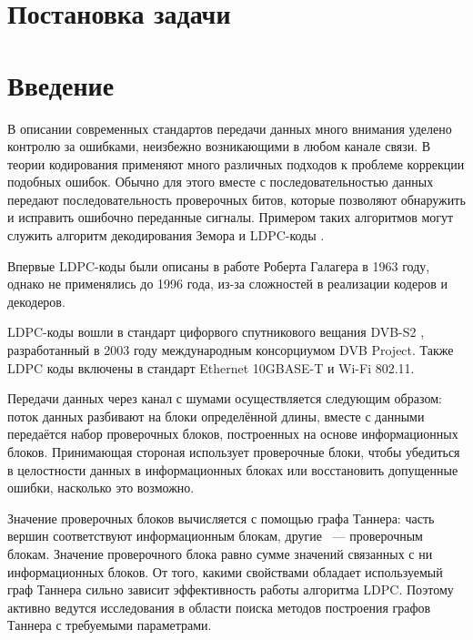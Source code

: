 \documentclass[14pt]{mmcs_article}
\begin{document}


\renewcommand{\contentsname}{Оглавление}

\tableofcontents

\newpage
{}

\section*{Постановка задачи}

\newpage
{}
\section*{Введение}

В описании современных стандартов передачи данных много внимания уделено контролю за ошибками, неизбежно возникающими в любом канале связи. В теории кодирования применяют много различных подходов к проблеме коррекции подобных ошибок. Обычно для этого вместе с последовательностью данных передают последовательность проверочных битов, которые позволяют обнаружить и исправить ошибочно переданные сигналы. Примером таких алгоритмов могут служить алгоритм декодирования Земора \cite{zemor} и LDPC-коды \cite{johnson}.

Впервые LDPC-коды были описаны в работе Роберта Галагера \cite{gallager} в 1963 году, однако не применялись до 1996 года, из-за сложностей в реализации кодеров и декодеров.

LDPC-коды вошли в стандарт цифорвого спутникового вещания DVB-S2 \cite{dvb-s2}, разработанный в 2003 году международным консорциумом DVB Project. Также LDPC коды включены в стандарт Ethernet 10GBASE-T и Wi-Fi 802.11.

Передачи данных через канал с шумами осуществляется следующим образом: поток данных разбивают на блоки определённой длины, вместе с данными передаётся набор проверочных блоков, построенных на основе информационных блоков. Принимающая стороная использует проверочные блоки, чтобы убедиться в целостности данных в информационных блоках или  восстановить допущенные ошибки, насколько это возможно.

Значение проверочных блоков вычисляется с помощью графа Таннера: часть вершин соответствуют информационным блокам, другие ~--- проверочным блокам. Значение проверочного блока равно сумме значений связанных с ни информационных блоков. От того, какими свойствами обладает используемый граф Таннера сильно зависит эффективность работы алгоритма LDPC. Поэтому активно ведутся исследования в области поиска методов построения графов Таннера с требуемыми параметрами.
\end{document}
